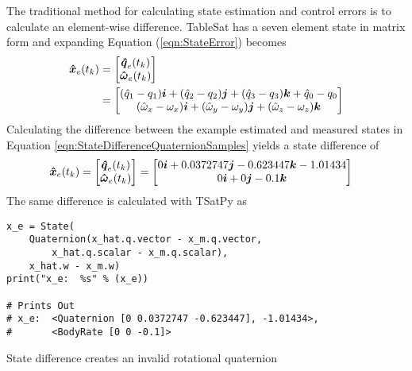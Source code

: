The traditional method for calculating state estimation and control errors is to calculate an element-wise difference.  TableSat has a seven element state in matrix form and expanding Equation (\ref{eqn:StateError}) becomes
\begin{equation}
  \begin{aligned}
    \boldsymbol{\hat{x}}_e(t_{k}) &= \begin{bmatrix}  \boldsymbol{\hat{q}}_e(t_{k}) \\ \boldsymbol{\hat{\omega}}_e(t_{k}) \\ \end{bmatrix} \\
    &= \begin{bmatrix} (\hat{q}_1 - q_{1}) \boldsymbol{i} + (\hat{q}_2 - q_{2}) \boldsymbol{j} + (\hat{q}_3 - q_{3}) \boldsymbol{k} + \hat{q}_0 - q_{0} \\ (\hat{\omega}_x - \omega_{x}) \boldsymbol{i} + (\hat{\omega}_y - \omega_{y}) \boldsymbol{j} + (\hat{\omega}_z - \omega_{z}) \boldsymbol{k} \end{bmatrix}
  \end{aligned}
  \label{eqn:StateDifference}
\end{equation}
Calculating the difference between the example estimated and measured states in Equation \ref{eqn:StateDifferenceQuaternionSamples} yields a state difference of
\begin{equation}
  \begin{aligned}
    \boldsymbol{\hat{x}}_e(t_{k})
    = \begin{bmatrix}  \boldsymbol{\hat{q}}_e(t_{k}) \\ \boldsymbol{\hat{\omega}}_e(t_{k}) \end{bmatrix}
    &= \begin{bmatrix} 0 \boldsymbol{i} +0.0372747 \boldsymbol{j} -0.623447 \boldsymbol{k} -1.01434 \\ 0 \boldsymbol{i} +0 \boldsymbol{j} -0.1 \boldsymbol{k} \end{bmatrix}
  \end{aligned}
  \label{eqn:StateDifferenceSample}
\end{equation}
The same difference is calculated with TSatPy as
\begin{listing}[H]
\begin{singlespace}
  \begin{verbatim}
x_e = State(
    Quaternion(x_hat.q.vector - x_m.q.vector,
        x_hat.q.scalar - x_m.q.scalar),
    x_hat.w - x_m.w)
print("x_e:  %s" % (x_e))

# Prints Out
# x_e:  <Quaternion [0 0.0372747 -0.623447], -1.01434>,
#       <BodyRate [0 0 -0.1]>
  \end{verbatim}
\caption{State difference creates an invalid rotational quaternion}
\label{code:state_difference}
\nocite{minted}
\end{singlespace}
\end{listing}

